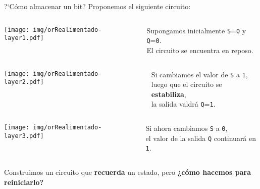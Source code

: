 \documentclass[aspectratio=169]{beamer}
\begin{document}
\begin{frame}[t]{?`Cómo almacenar un bit?}
    Proponemos el siguiente circuito:
    \vspace{0.2cm}
    \begin{columns}[c]
    \begin{center} \texttt{[image: img/orRealimentado-layer1.pdf]} \end{center}
    Supongamos inicialmente \texttt{S}=\texttt{0} y \texttt{Q}=\texttt{0}.\\
    El circuito se encuentra en reposo.
    \end{columns}
    \vspace{0.3cm}\pause
    \begin{columns}[c]
    \begin{center} \texttt{[image: img/orRealimentado-layer2.pdf]} \end{center}
    Si cambiamos el valor de \texttt{S} a \texttt{1}, \\ luego que el circuito se \textbf{estabiliza}, \\ la salida valdrá \texttt{Q}=\texttt{1}.
    \end{columns}
    \vspace{0.3cm}\pause
    \begin{columns}[c]
    \begin{center} \texttt{[image: img/orRealimentado-layer3.pdf]} \end{center}
    Si ahora cambiamos \texttt{S} a \texttt{0},\\ el valor de la salida \texttt{Q} continuará en \texttt{1}.
    \end{columns}
    \vspace{0.8cm}
    \textcolor{verdeuca}{Construimos un circuito que \textbf{recuerda} un estado, pero} \textcolor{naranjauca}{\textbf{¿cómo hacemos para reiniciarlo?}}
\end{frame}
\end{document}
